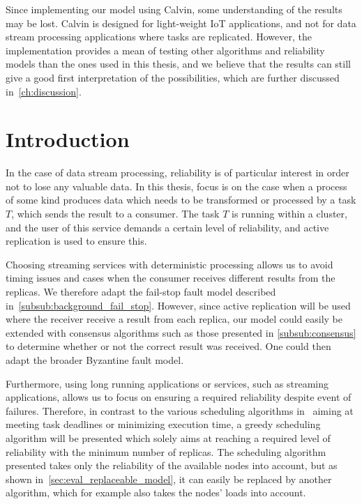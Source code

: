 \documentclass{cslthse-msc}
\begin{document}
Since implementing our model using Calvin, some understanding of the results may be lost. Calvin is designed for light-weight IoT applications, and not for data stream processing applications where tasks are replicated. However, the implementation provides a mean of testing other algorithms and reliability models than the ones used in this thesis, and we believe that the results can still give a good first interpretation of the possibilities, which are further discussed in~\cref{ch:discussion}.

\section{Introduction} \label{sec:design_intro}
In the case of data stream processing, reliability is of particular interest in order not to lose any valuable data. In this thesis, focus is on the case when a process of some kind produces data which needs to be transformed or processed by a task $T$, which sends the result to a consumer. The task $T$ is running within a cluster, and the user of this service demands a certain level of reliability, and active replication is used to ensure this.	

Choosing streaming services with deterministic processing allows us to avoid timing issues and cases when the consumer receives different results from the replicas. We therefore adapt the fail-stop fault model described in~\cref{subsub:background_fail_stop}. However, since active replication will be used where the receiver receive a result from each replica, our model could easily be extended with consensus algorithms such as those presented in \cref{subsub:consensus} to determine whether or not the correct result was received. One could then adapt the broader Byzantine fault model. 

Furthermore, using long running applications or services, such as streaming applications, allows us to focus on ensuring a required reliability despite event of failures. Therefore, in contrast to the various scheduling algorithms in~\cite{algoOptTimeMaxRel, optTaskAllocationForMaxRel, taskAllocation, taskAllocationSwarm, algoMaxRelEndToEndConstraint, algoMinExTime, schedReplicas} aiming at meeting task deadlines or minimizing execution time, a greedy scheduling algorithm will be presented which solely aims at reaching a required level of reliability with the minimum number of replicas. The scheduling algorithm presented takes only the reliability of the available nodes into account, but as shown in~\cref{sec:eval_replaceable_model}, it can easily be replaced by another algorithm, which for example also takes the nodes' loads into account.
\end{document}
